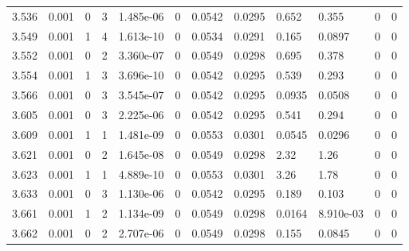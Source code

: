 \documentclass[preview]{standalone}
\begin{document}
{{{{{{\begin{tabular}{L{1.2cm}C{1.2cm} C{0.3cm}C{0.5cm} C{1.4cm}C{1.4cm} C{1.4cm}C{1.4cm} C{1.6cm}C{1.6cm} C{1.6cm}C{1.6cm}}
  3.536  &  0.001  & 0     &  3 &  1.485e-06  & 0  &  0.0542&   0.0295& 0.652 & 0.355   &  0 & 0  \\ 
  3.549  &  0.001  & 1     &  4 &  1.613e-10  & 0  &  0.0534&   0.0291& 0.165 & 0.0897   &  0 & 0  \\ 
  3.552  &  0.001  & 0     &  2 &  3.360e-07  & 0  &  0.0549&   0.0298& 0.695 & 0.378   &  0 & 0  \\ 
  3.554  &  0.001  & 1     &  3 &  3.696e-10  & 0  &  0.0542&   0.0295& 0.539 & 0.293   &  0 & 0  \\ 
  3.566  &  0.001  & 0     &  3 &  3.545e-07  & 0  &  0.0542&   0.0295& 0.0935 & 0.0508   &  0 & 0  \\ 
  3.605  &  0.001  & 0     &  3 &  2.225e-06  & 0  &  0.0542&   0.0295& 0.541 & 0.294   &  0 & 0  \\ 
  3.609  &  0.001  & 1     &  1 &  1.481e-09  & 0  &  0.0553&   0.0301& 0.0545 & 0.0296   &  0 & 0  \\ 
  3.621  &  0.001  & 0     &  2 &  1.645e-08  & 0  &  0.0549&   0.0298& 2.32 & 1.26   &  0 & 0  \\ 
  3.623  &  0.001  & 1     &  1 &  4.889e-10  & 0  &  0.0553&   0.0301& 3.26 & 1.78   &  0 & 0  \\ 
  3.633  &  0.001  & 0     &  3 &  1.130e-06  & 0  &  0.0542&   0.0295& 0.189 & 0.103   &  0 & 0  \\ 
  3.661  &  0.001  & 1     &  2 &  1.134e-09  & 0  &  0.0549&   0.0298& 0.0164 & 8.910e-03   &  0 & 0  \\ 
  3.662  &  0.001  & 0     &  2 &  2.707e-06  & 0  &  0.0549&   0.0298& 0.155 & 0.0845   &  0 & 0  \\ 
\hline 
\end{tabular} 

}}}}}}
\end{document}
